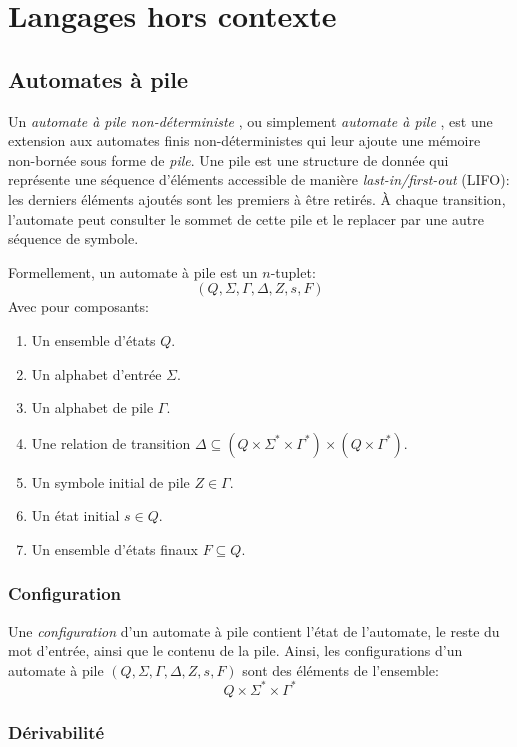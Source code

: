 \chapter{Langages hors contexte}

\section{Automates à pile}

Un \og \textit{automate à pile non-déterministe} \fg, ou simplement \og \textit{automate à pile} \fg, est une extension aux automates finis non-déterministes qui leur ajoute une mémoire non-bornée sous forme de \textit{pile}.
Une pile est une structure de donnée qui représente une séquence d'éléments accessible de manière \textit{last-in/first-out} (LIFO): les derniers éléments ajoutés sont les premiers à être retirés.
À chaque transition, l'automate peut consulter le sommet de cette pile et le replacer par une autre séquence de symbole.

Formellement, un automate à pile est un $n$-tuplet:
\[
(Q, \Sigma, \Gamma, \Delta, Z, s, F)
\]
Avec pour composants:
\begin{enumerate}
\item
Un ensemble d'états $Q$.
\item
Un alphabet d'entrée $\Sigma$.
\item
Un alphabet de pile $\Gamma$.
\item
Une relation de transition $\Delta \subseteq (Q \times \Sigma^* \times \Gamma^*) \times (Q \times \Gamma^*)$.
\item
Un symbole initial de pile $Z \in \Gamma$.
\item
Un état initial $s \in Q$.
\item
Un ensemble d'états finaux $F \subseteq Q$.
\end{enumerate}

\subsection{Configuration}

Une \og \textit{configuration} \fg{} d'un automate à pile contient l'état de l'automate, le reste du mot d'entrée, ainsi que le contenu de la pile.
Ainsi, les configurations d'un automate à pile $(Q, \Sigma, \Gamma, \Delta, Z, s, F)$ sont des éléments de l'ensemble:
\[
Q \times \Sigma^* \times \Gamma^*
\]

\subsection{Dérivabilité}

